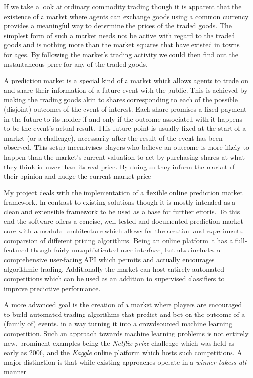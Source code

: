 \documentclass[bsc,frontabs,twoside,singlespacing,parskip,deptreport]{infthesis}     %
\begin{document}
	If we take a look at ordinary commodity trading though it is apparent that the existence of a market where agents can exchange goods using a common currency provides a meaningful way to determine the prices of the traded goods. The simplest form of such a market needs not be active with regard to the traded goods and is nothing more than the market squares that have existed in towns for ages. By following the market's trading activity we could then find out the instantaneous price for any of the traded goods. 

	A prediction market is a special kind of a market which allows agents to trade on and share their information of a future event with the public. This is achieved by making the trading goods akin to shares corresponding to each of the possible (disjoint) outcomes of the event of interest. Each share promises a fixed payment in the future to its holder if and only if the outcome associated with it happens to be the event's actual result. This future point is usually fixed at the start of a market (or a challenge), necessarily after the result of the event has been observed. This setup incentivises players who believe an outcome is more likely to happen than the market's current valuation to act by purchasing shares at what they think is lower than its real price. By doing so they inform the market of their opinion and nudge the current market price 

	My project deals with the implementation of a flexible online prediction market framework. In contrast to existing solutions  though it is mostly intended as a clean and extensible framework to be used as a base for further efforts. To this end the software offers a concise, well-tested and documented prediction market core with a modular architecture which allows for the creation and experimental comparsion of different pricing algorithms. Being an online platform it has a full-featured though fairly unsophisticated user interface, but also includes a comprehensive user-facing API which permits and actually encourages algorithmic trading. Additionally the market can host entirely automated competitions which can be used as an addition to supervised classifiers to improve predictive performance. 

	A more advanced goal is the creation of a market where players are encouraged to build automated trading algorithms that predict and bet on the outcome of a (family of) events.  in a way turning it into a crowdsourced machine learning competition. Such an approach towards machine learning problems is not entirely new, prominent examples being the {\em Netflix prize} challenge which was held as early as 2006, and the {\em Kaggle} online platform which hosts such competitions. A major distinction is that while existing approaches operate in a {\em winner takess all} manner
\end{document}
